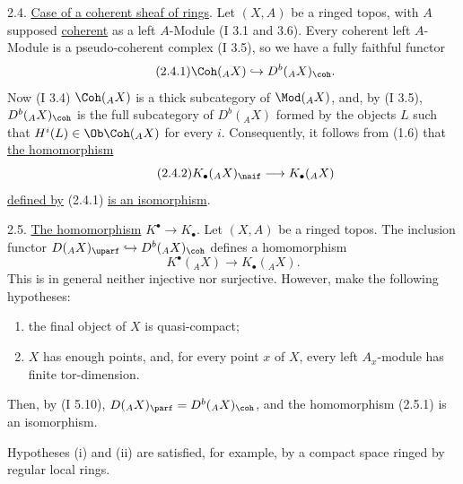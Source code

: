 2.4. \uline{Case of a coherent sheaf of rings}. Let \((X,A)\) be a ringed topos, with \(A\) supposed \uline{coherent} as a left \(A\)-Module (I 3.1 and 3.6). Every coherent left \(A\)-Module is a pseudo-coherent complex (I 3.5), so we have a fully faithful functor
\begin{equation}\tag{2.4.1}
 \Coh({}_A X)\hookrightarrow D^b({}_A X)_{\coh}.
\end{equation}
Now (I 3.4) \(\Coh({}_A X)\) is a thick subcategory of \(\Mod({}_A X)\), and, by (I 3.5), \(D^b({}_A X)_{\coh}\) is the full subcategory of \(D^b({}_A X)\) formed by the objects \(L\) such that \(H^i(L)\in\Ob\Coh({}_A X)\) for every \(i\). Consequently, it follows from (1.6) that \uline{the homomorphism}
\begin{equation}\tag{2.4.2}
 K_\bullet({}_A X)_{\naif}\longrightarrow K_\bullet({}_A X)
\end{equation}
\uline{defined by} (2.4.1) \uline{is an isomorphism}.

2.5. \uline{The homomorphism} \(K^{\bullet}\to K_\bullet\). Let \((X,A)\) be a ringed topos. The inclusion functor \(D({}_A X)_{\uparf}\hookrightarrow D^b({}_A X)_{\coh}\) defines a homomorphism
\begin{equation}\tag{2.5.1}
 K^{\bullet}({}_A X)\longrightarrow K_\bullet({}_A X).
\end{equation}
This is in general neither injective nor surjective. However, make the following hypotheses:
\begin{enumerate}[label=(\roman*)]

\item{}%
the final object of \(X\) is quasi-compact;
\item \(X\) has enough points, and, for every point \(x\) of \(X\), every left \(A_x\)-module has finite tor-dimension.
\end{enumerate}
Then, by (I 5.10), \(D({}_A X)_{\parf}=D^b({}_A X)_{\coh}\), and the homomorphism (2.5.1) is an isomorphism.

Hypotheses (i) and (ii) are satisfied, for example, by a compact space ringed by regular local rings.

